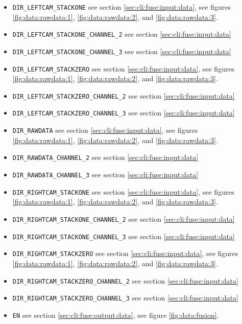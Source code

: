\begin{itemize}
\itemsep -0.5ex
\item \texttt{DIR\_LEFTCAM\_STACKONE} 
see section \ref{sec:cli:fuse:input:data}, 
see figures \ref{fig:data:rawdata:1}, 
\ref{fig:data:rawdata:2}, 
and \ref{fig:data:rawdata:3}.
\item \texttt{DIR\_LEFTCAM\_STACKONE\_CHANNEL\_2} 
see section \ref{sec:cli:fuse:input:data}
\item \texttt{DIR\_LEFTCAM\_STACKONE\_CHANNEL\_3} 
see section \ref{sec:cli:fuse:input:data}
\item \texttt{DIR\_LEFTCAM\_STACKZERO} 
see section \ref{sec:cli:fuse:input:data},
see figures \ref{fig:data:rawdata:1}, 
\ref{fig:data:rawdata:2}, 
and \ref{fig:data:rawdata:3}.
\item \texttt{DIR\_LEFTCAM\_STACKZERO\_CHANNEL\_2} 
see section \ref{sec:cli:fuse:input:data}
\item \texttt{DIR\_LEFTCAM\_STACKZERO\_CHANNEL\_3} 
see section \ref{sec:cli:fuse:input:data}
\item \texttt{DIR\_RAWDATA} 
see section \ref{sec:cli:fuse:input:data},
see figures \ref{fig:data:rawdata:1}, 
\ref{fig:data:rawdata:2}, 
and \ref{fig:data:rawdata:3}.
\item \texttt{DIR\_RAWDATA\_CHANNEL\_2} 
see section \ref{sec:cli:fuse:input:data}
\item \texttt{DIR\_RAWDATA\_CHANNEL\_3} 
see section \ref{sec:cli:fuse:input:data}
\item \texttt{DIR\_RIGHTCAM\_STACKONE} 
see section \ref{sec:cli:fuse:input:data},
see figures \ref{fig:data:rawdata:1}, 
\ref{fig:data:rawdata:2}, 
and \ref{fig:data:rawdata:3}.
\item \texttt{DIR\_RIGHTCAM\_STACKONE\_CHANNEL\_2} 
see section \ref{sec:cli:fuse:input:data}
\item \texttt{DIR\_RIGHTCAM\_STACKONE\_CHANNEL\_3} 
see section \ref{sec:cli:fuse:input:data}
\item \texttt{DIR\_RIGHTCAM\_STACKZERO} 
see section \ref{sec:cli:fuse:input:data},
see figures \ref{fig:data:rawdata:1}, 
\ref{fig:data:rawdata:2}, 
and \ref{fig:data:rawdata:3}.
\item \texttt{DIR\_RIGHTCAM\_STACKZERO\_CHANNEL\_2} 
see section \ref{sec:cli:fuse:input:data}
\item \texttt{DIR\_RIGHTCAM\_STACKZERO\_CHANNEL\_3} 
see section \ref{sec:cli:fuse:input:data}
\item \texttt{EN} 
see section \ref{sec:cli:fuse:output:data},
see figure \ref{fig:data:fusion}.

\end{itemize}

